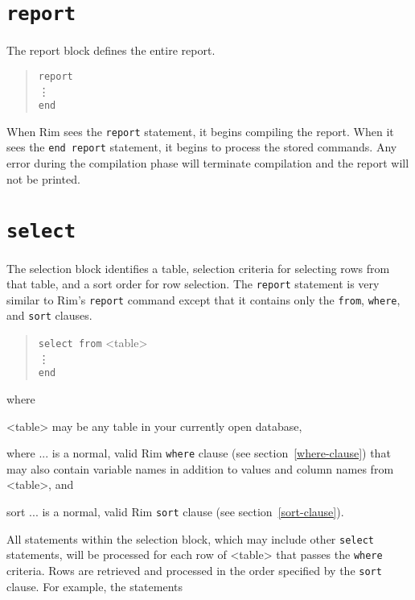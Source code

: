 \documentclass[11pt,a4paper]{report}
\begin{document}
\section{\tt report}
%
The report block defines the entire report.
\begin{verse}
  \verb!report!\\ \quad\vdots\\
  \verb!end! 
\end{verse}
 When Rim sees the
 \verb!report! statement, it begins compiling the report.  When
it sees the \verb!end report! statement, it begins to process the stored commands.
Any error during the compilation phase will terminate compilation
and the report will not be printed.
 
 
\section{\tt select}
%
The selection block identifies a table, selection criteria for
selecting rows from that table, and a sort order for row selection.
The \verb!report! statement is very similar to Rim's \verb!report! command
except that it contains only the \verb!from!, \verb!where!, and \verb!sort! clauses.
\begin{verse}
  \verb!select from! <table> 
   \\
  \quad\vdots\\
  \verb!end! 
\end{verse}
where
\begin{List}
\item[<table>] may be any table in your currently open database,
\item[where ...] is a normal, valid Rim \verb!where! clause
(see section~\ref{where-clause}) that may also contain variable
names in addition to values and column names from <table>, and
\item[sort ...] is a normal, valid Rim \verb!sort! clause
(see section~\ref{sort-clause}).
\end{List}
 
All statements within the selection block,
which may include other \verb!select! statements,
will be processed for each row of <table>
that passes the \verb!where! criteria.  Rows are retrieved
and processed in the order specified by the \verb!sort! clause.
For example, the statements
 
\end{document}

